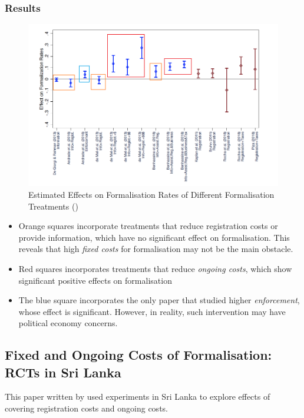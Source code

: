         \subsubsection{Results}
            \begin{figure}[H]
                \centering
                \includegraphics[width=5in]{images/ch5/formal policies evaluation.png}
                \caption{Estimated Effects on Formalisation Rates of Different Formalisation Treatments (\cite{ulyssea_informality_2020})}
            \end{figure}
            \begin{itemize}
                \item Orange squares incorporate treatments that reduce registration costs or provide information, which have no significant effect on formalisation. This reveals that high \emph{fixed costs} for formalisation may not be the main obstacle.
                \item Red squares incorporates treatments that reduce \emph{ongoing costs}, which show significant positive effects on formalisation
                \item The blue square incorporates the only paper that studied higher \emph{enforcement}, whose effect is significant. However, in reality, such intervention may have political economy concerns.
            \end{itemize}
    
    \subsection{Fixed and Ongoing Costs of Formalisation: RCTs in Sri Lanka}
        This paper written by \cite{de_mel_demand_2013} used experiments in Sri Lanka to explore effects of covering registration costs and ongoing costs.
        
